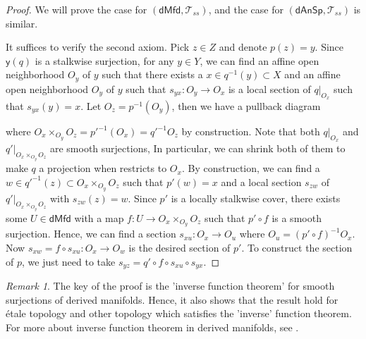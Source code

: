 \documentclass[12pt]{amsart}
\theoremstyle{definition}
\theoremstyle{remark}
\newtheorem{rem}[thm]{Remark}
\numberwithin{equation}{section}
\newcommand{\1}{{\mathbb{1}}}
\newcommand{\y}{\mathsf{y}}
\newcommand{\dmfd}{\mathsf{dMfd}}
\newcommand{\dan}{\mathsf{dAnSp}}
\begin{document}
\begin{proof} We will prove the case for  $(\dmfd,\mathcal{T}_{ss})$, and the case for $(\dan,\mathcal{T}_{ss})$ is similar. 

It suffices to verify the second axiom. Pick $z\in Z$ and denote $p(z)=y$. Since $\y(q)$ is a stalkwise surjection, for any $y\in Y$, we can find an affine open neighborhood $O_y$ of $y$ such that there exists a $x\in q^{-1}(y) \subset X$ and an affine open neighborhood $O_y$ of $y$ such that $s_{yx}:O_y \to O_x$ is a local section of $q|_{O_x}$ such that $s_{yx}(y)=x$. Let $O_z=p^{-1}(O_y)$, then we have a pullback diagram
\begin{center}
\end{center}
where $O_x\times_{O_y} O_z= p'^{-1}(O_x)=q'^{-1}O_z$ by construction. Note that both $q|_{O_x}$ and $q'|_{O_x\times_{O_y} O_z}$ are smooth surjections, In particular, we can shrink both of them to make $q$ a projection when restricts to $O_x$. By construction, we can find a $w\in q'^{-1}(z)\subset O_x\times_{O_y} O_z$ such that $p'(w)=x$ and a local section $s_{zw}$ of $q'|_{O_x\times_{O_y} O_z}$ with $s_{zw}(z)=w$. Since $p'$ is a locally stalkwise cover, there exists some $U\in \dmfd$ with a map $f: U \to O_x\times_{O_y} O_z $ such that $ p'\circ f$ is a smooth surjection. Hence, we can find a section $s_{xu}:O_x \to O_u$ where $O_u = ( p'\circ f)^{-1} O_x$. Now $s_{xw}=f\circ s_{xu}: O_x \to O_w$ is the desired section of $p'$. To construct the section of $p$, we just need to take $s_{yz}=q'\circ f\circ s_{xu}\circ s_{yx}$.
	\end{proof}
	
	\begin{rem}
 	    The key of the proof is the 'inverse function theorem' for smooth surjections of derived manifolds. Hence, it also shows that the result hold for \'{e}tale topology and other topology which satisfies the 'inverse' function theorem. For more about inverse function theorem in derived manifolds, see \cite[Proposition 6.2.1]{Nui18}.
	\end{rem}
	
\end{document}
